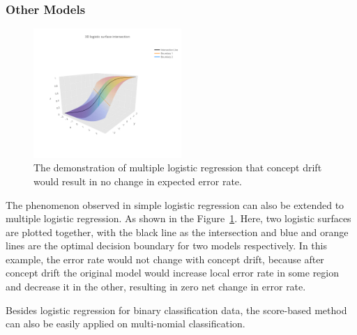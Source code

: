\documentclass[twoside,11pt]{article}
\begin{document}
\subsubsection{Other Models}
\begin{figure}[!htbp]
\centering
 \includegraphics[width = 0.5\textwidth]{../figures/v14/demons_fig/3D_logistic_surface_intersection.png}
  \caption{The demonstration of multiple logistic regression that concept drift would result in no change in expected error rate.}
  \label{fig:logi_3d}
\end{figure}
The phenomenon observed in simple logistic regression can also be extended to multiple logistic regression. As shown in the Figure~\ref{fig:logi_3d}. Here, two logistic surfaces are plotted together, with the black line as the intersection and blue and orange lines are the optimal decision boundary for two models respectively. In this example, the error rate would not change with concept drift, because after concept drift the original model would increase local error rate in some region and decrease it in the other, resulting in zero net change in error rate. 

Besides logistic regression for binary classification data, the score-based method can also be easily applied on multi-nomial classification. 
\end{document}
